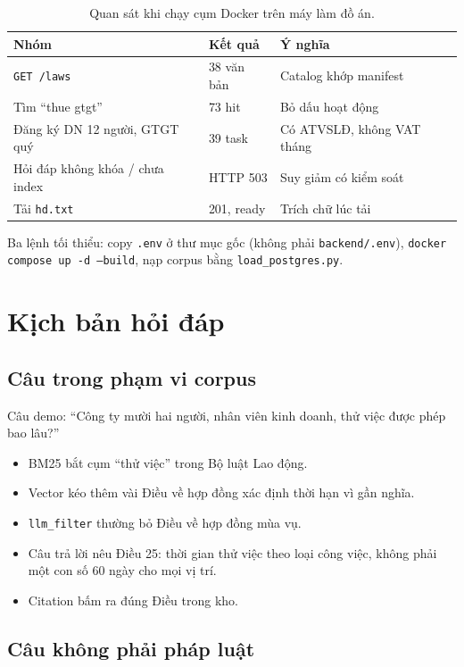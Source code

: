 \begin{table}[htp]
\centering
\caption{Quan sát khi chạy cụm Docker trên máy làm đồ án.}
\label{tab:ket-qua-test}
\begin{tabular}{p{4.4cm}p{2.8cm}p{6.6cm}}
\toprule
\textbf{Nhóm} & \textbf{Kết quả} & \textbf{Ý nghĩa} \\
\midrule
\texttt{GET /laws} & 38 văn bản & Catalog khớp manifest \\
Tìm ``thue gtgt'' & 73 hit & Bỏ dấu hoạt động \\
Đăng ký DN 12 người, GTGT quý & 39 task & Có ATVSLĐ, không VAT tháng \\
Hỏi đáp không khóa / chưa index & HTTP 503 & Suy giảm có kiểm soát \\
Tải \texttt{hd.txt} & 201, ready & Trích chữ lúc tải \\
\bottomrule
\end{tabular}
\end{table}

Ba lệnh tối thiểu: copy \texttt{.env} ở thư mục gốc (không phải
\texttt{backend/.env}), \texttt{docker compose up -d --build}, nạp corpus bằng
\texttt{load\_postgres.py}.

\section{Kịch bản hỏi đáp}

\subsection{Câu trong phạm vi corpus}

Câu demo: ``Công ty mười hai người, nhân viên kinh doanh, thử việc được phép
bao lâu?''

\begin{itemize}
    \item BM25 bắt cụm ``thử việc'' trong Bộ luật Lao động.
    \item Vector kéo thêm vài Điều về hợp đồng xác định thời hạn vì gần nghĩa.
    \item \texttt{llm\_filter} thường bỏ Điều về hợp đồng mùa vụ.
    \item Câu trả lời nêu Điều 25: thời gian thử việc theo loại công việc, không
    phải một con số 60 ngày cho mọi vị trí.
    \item Citation bấm ra đúng Điều trong kho.
\end{itemize}

\subsection{Câu không phải pháp luật}


